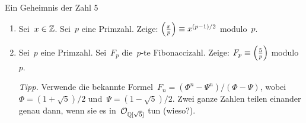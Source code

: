 \documentclass[entwurf]{uebblatt}
\begin{document}
\begin{aufgabe}{Ein Geheimnis der Zahl 5}
\begin{enumerate}
\item Sei~$x \in \mathbb{Z}$. Sei~$p$ eine Primzahl. Zeige: $\left(\frac{x}{p}\right) \equiv
x^{(p-1)/2}$ modulo~$p$.
\item Sei~$p$ eine Primzahl. Sei~$F_p$ die~$p$-te Fibonaccizahl. Zeige: $F_p
\equiv \left(\frac{5}{p}\right)$ modulo~$p$.

{\tiny\emph{Tipp.} Verwende die bekannte Formel~$F_n = (\Phi^n - \Psi^n) /
(\Phi - \Psi)$, wobei~$\Phi = (1 + \sqrt{5})/2$ und~$\Psi = (1 - \sqrt{5})/2$.
Zwei ganze Zahlen teilen einander genau dann, wenn sie es
in~$\mathcal{O}_{\mathbb{Q}[\sqrt{5}]}$ tun (wieso?).\par}
\end{enumerate}
\end{aufgabe}
\end{document}

